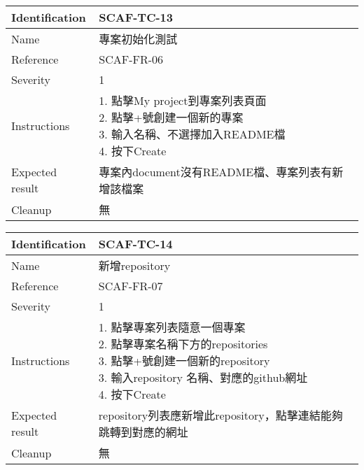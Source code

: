 \documentclass{report}
\begin{document}
\begin{tabularx}{0.9\textwidth}{
  |p{}%
  |p{}|%
  }
  \hline
  \centering Identification &  SCAF-TC-13 \\
  \hline
  \centering Name & 專案初始化測試 \\
  \hline
  \centering Reference & SCAF-FR-06 \\
  \hline
  \centering Severity & 1 \\
  \hline
  \centering Instructions & 
  \makecell{
    1. 點擊My project到專案列表頁面  \\
    2. 點擊+號創建一個新的專案  \\
    3. 輸入名稱、不選擇加入README檔  \\
    4. 按下Create
  }\\
  \hline
  \centering Expected result & 專案內document沒有README檔、專案列表有新增該檔案 \\
  \hline
  \centering Cleanup & 無 \\
  \hline
\end{tabularx}
\newline\newline

\begin{tabularx}{0.9\textwidth}{
  |p{}%
  |p{}|%
  }
  \hline
  \centering Identification &  SCAF-TC-14 \\
  \hline
  \centering Name & 新增repository \\
  \hline
  \centering Reference & SCAF-FR-07 \\
  \hline
  \centering Severity & 1 \\
  \hline
  \centering Instructions & 
  \makecell{
    1. 點擊專案列表隨意一個專案 \\
    2. 點擊專案名稱下方的repositories \\
    3. 點擊+號創建一個新的repository \\
    3. 輸入repository 名稱、對應的github網址  \\
    4. 按下Create
  }\\
  \hline
  \centering Expected result & repository列表應新增此repository，點擊連結能夠跳轉到對應的網址 \\
  \hline
  \centering Cleanup & 無 \\
  \hline
\end{tabularx}
\newline\newline
\end{document}
